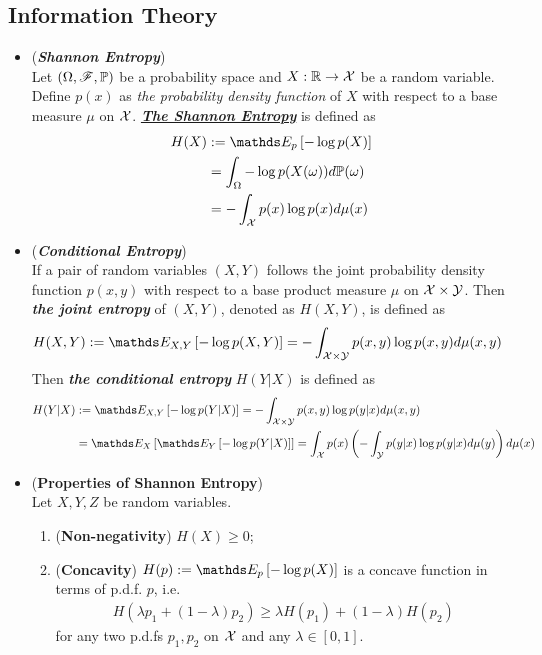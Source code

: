 \documentclass[11pt]{article}
\begin{document}
\subsection{Information Theory}
\begin{itemize}
\item \begin{definition} (\textbf{\emph{Shannon Entropy}}) \citep{thomas2006elements}\\
Let $(\Omega, {\mathscr F}, {\mathbb P})$ be a probability space and $X: {\mathbb R} \to {\mathcal X}$ be a random variable. Define $p(x)$ as \emph{the probability density function} of $X$ with respect to a base measure $\mu$ on ${\mathcal X}$. \underline{\emph{\textbf{The Shannon Entropy}}} is defined as 
\begin{align*}
H(X) &:= \E{p}{-\log p(X)} \\
&= \int_{\Omega} -\log p(X(\omega)) d\bP(\omega) \\
&= - \int_{\cX} p(x)  \log p(x) d\mu(x)
\end{align*}
\end{definition}

\item \begin{definition} (\textbf{\emph{Conditional Entropy}}) \citep{thomas2006elements}\\
If a pair of random variables $(X, Y)$ follows the joint probability density function $p(x, y)$ with respect to a base product measure $\mu$ on ${\mathcal X} \times {\mathcal Y}$. Then \emph{\textbf{the joint entropy}} of $(X, Y)$, denoted as $H(X, Y)$, is defined as
\begin{align*}
H(X, Y) &:=  \E{X, Y}{-\log p(X, Y)} = - \int_{\cX \times \cY} p(x, y)  \log p(x, y) d\mu(x, y)
\end{align*} Then \emph{\textbf{the conditional entropy}} $H(Y | X)$ is defined as
\begin{align*}
H(Y | X) &:= \E{X, Y}{-\log p(Y|X)}  = -\int_{\cX \times \cY} p(x, y)  \log p(y | x) d\mu(x, y) \\
&=  \E{X}{\E{Y}{-\log p(Y|X)}} = \int_{\cX}p(x) \paren{-\int_{\cY}p(y|x) \log p(y|x) d\mu(y)}d\mu(x)
\end{align*}
\end{definition}

\item \begin{proposition}(\textbf{Properties of Shannon Entropy})  \citep{thomas2006elements}\\
Let $X, Y, Z$ be random variables. 
\begin{enumerate}
\item (\textbf{Non-negativity}) $H(X) \ge 0$;
\item (\textbf{Concavity}) $H(p) := \E{p}{-\log p(X)}$ is a concave function in terms of p.d.f. $p$, i.e.
\begin{align*}
H(\lambda p_1 + (1- \lambda) p_2) \ge \lambda H(p_1) + (1- \lambda) H(p_2)
\end{align*} for any two p.d.fs $p_1, p_2$ on ${\mathcal X}$ and any $\lambda \in [0,1]$.
\end{enumerate}
\end{proposition}


\end{itemize}
\end{document}

